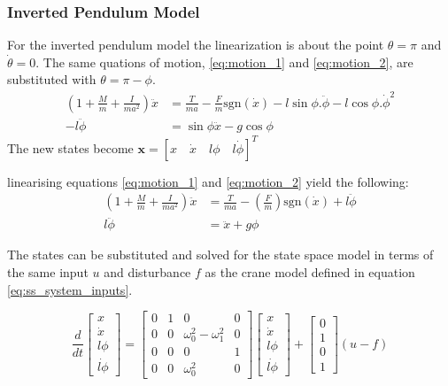 \documentclass{article}
\begin{document}
\subsubsection{Inverted Pendulum Model}

For the inverted pendulum model the linearization is about the point $\theta = \pi$ and $\dot{\theta} = 0$.
The same quations of motion, \ref{eq:motion_1} and \ref{eq:motion_2}, are substituted with $\theta = \pi - \phi$.
\begin{align}
  \left( 1 + \frac{M}{m} + \frac{I}{ma^2} \right) \ddot{x} &= \frac{T}{ma} - \frac{F}{m}\text{sgn}(\dot{x}) - l\sin\phi . \ddot{\phi} - l\cos\phi . \dot{\phi}^2 \\
   - l \ddot{\phi} &= \sin\phi \ddot{x} - g\cos\phi
\end{align}
The new states become $\mathbf{x} = \left[ x \quad \dot{x} \quad l\phi \quad l\dot{\phi} \right]^T$

linearising equations \ref{eq:motion_1} and \ref{eq:motion_2} yield the following:
\begin{align}
  \left( 1 + \frac{M}{m} + \frac{I}{ma^2} \right) \ddot{x} &= \frac{T}{ma} - \left(\frac{F}{m} \right)\text{sgn}(\dot{x}) + l \ddot{\phi} \label{eq:invp_motion_1} \\
  l \ddot{\phi} &= \ddot{x} + g\phi \label{eq:invp_motion_2}
\end{align}

The states can be substituted and solved for the state space model in terms of the same input $u$ and disturbance $f$ as the crane model defined in equation \ref{eq:ss_system_inputs}.

\begin{equation}
  \frac{d}{dt} 
  \begin{bmatrix}
     x \\ \dot{x} \\ l\phi \\ \dot{l\phi} \end{bmatrix} = \begin{bmatrix} 
      0 & 1 & 0 & 0 \\ 0 & 0 & \omega_0^2 - \omega_1^2 & 0 \\ 0 & 0 & 0 & 1 \\ 0 & 0 & \omega_0^2 & 0 \end{bmatrix} \begin{bmatrix} 
        x \\ \dot{x} \\ l\phi \\ \dot{l\phi} \end{bmatrix} + \begin{bmatrix} 
          0 \\ 1 \\ 0 \\ 1 \end{bmatrix} (u - f)
\end{equation}
\end{document}
